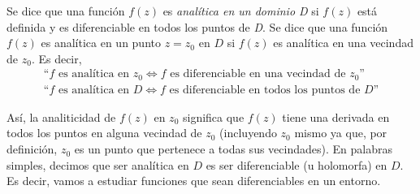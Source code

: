 Se dice que una función $f(z)$ es \textit{analítica en un dominio D} si $f(z)$ está definida y es diferenciable en todos los puntos de \textit{D}. Se dice que una función $f(z)$ es analítica en un punto $z=z_0$ en $D$ si $f(z)$ es analítica en una vecindad de $z_0$. Es decir, 
\begin{gather*}
  \text{``}f \text{ es analítica en }z_0 \Leftrightarrow f \text{ es diferenciable en una vecindad de }z_0\text{''} \\ 
  \text{``}f \text{ es analítica en }D \Leftrightarrow f \text{ es diferenciable en todos los puntos de }D\text{''}
\end{gather*}

Así, la analiticidad de $f(z)$ en $z_0$ significa que $f(z)$ tiene una derivada en todos los puntos en alguna vecindad de $z_0$ (incluyendo $z_0$ mismo ya que, por definición, $z_0$ es un punto que pertenece a todas sus vecindades). En palabras simples, decimos que ser analítica en $D$ es ser diferenciable (u holomorfa) en $D$. Es decir, vamos a estudiar funciones que sean diferenciables en un entorno.


